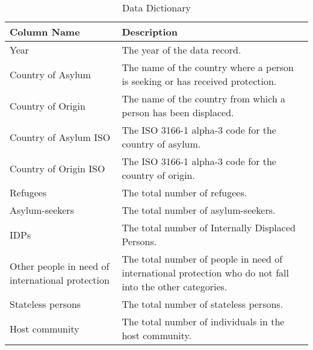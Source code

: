 \documentclass{article}
\theoremstyle{plain}
\theoremstyle{definition}
\theoremstyle{remark}
\begin{document}
\begin{table}[H]

\caption{Data Dictionary}

\label{tab:data_dict}

\vskip 0.15in

\begin{center}

\begin{small}

\renewcommand{\arraystretch}{1.3} %
\setlength{\tabcolsep}{6pt} %

\begin{tabular}{|p{}|p{}|}
\hline
\textbf{Column Name} & \textbf{Description} \\
\hline

Year & The year of the data record. \\
\hline

Country of Asylum & The name of the country where a person is seeking or has received protection. \\
\hline

Country of Origin & The name of the country from which a person has been displaced. \\
\hline

Country of Asylum ISO & The ISO 3166-1 alpha-3 code for the country of asylum. \\
\hline

Country of Origin ISO & The ISO 3166-1 alpha-3 code for the country of origin. \\
\hline

Refugees & The total number of refugees. \\
\hline

Asylum-seekers & The total number of asylum-seekers. \\
\hline

IDPs & The total number of Internally Displaced Persons. \\
\hline

Other people in need of international protection & The total number of people in need of international protection who do not fall into the other categories. \\
\hline

Stateless persons & The total number of stateless persons. \\
\hline

Host community & The total number of individuals in the host community. \\
\hline


\end{tabular}
\end{small}
\end{center}
\end{table}
\end{document}
